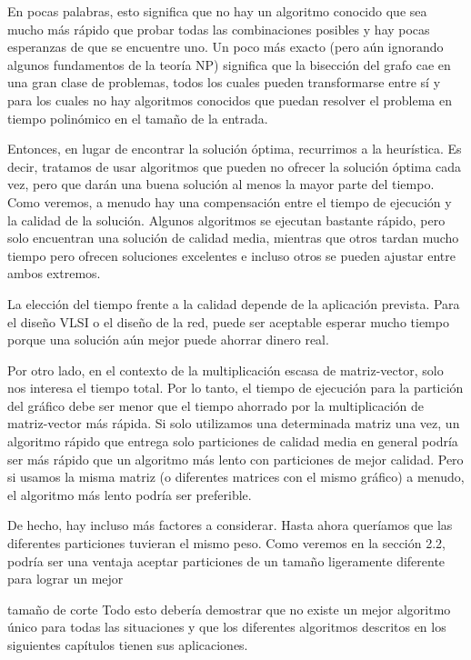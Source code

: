 En pocas palabras, esto significa que no hay un algoritmo conocido que sea mucho más rápido que probar todas las combinaciones posibles y hay pocas esperanzas de que se encuentre uno. Un poco más exacto (pero aún ignorando algunos fundamentos de la teoría NP) significa que la bisección del grafo cae en una gran clase de problemas, todos los cuales pueden transformarse entre sí y para los cuales no hay algoritmos conocidos que puedan resolver el problema en tiempo polinómico en el tamaño de la entrada.

Entonces, en lugar de encontrar la solución óptima, recurrimos a la heurística. Es decir, tratamos de usar algoritmos que pueden no ofrecer la solución óptima cada vez, pero que darán una buena solución al menos la mayor parte del tiempo. Como veremos, a menudo hay una compensación entre el tiempo de ejecución y la calidad de la solución. Algunos algoritmos se ejecutan bastante rápido, pero solo encuentran una solución de calidad media, mientras que otros tardan mucho tiempo pero ofrecen soluciones excelentes e incluso otros se pueden ajustar entre ambos extremos.

La elección del tiempo frente a la calidad depende de la aplicación prevista. Para el diseño VLSI o el diseño de la red, puede ser aceptable esperar mucho tiempo porque una solución aún mejor puede ahorrar dinero real.

Por otro lado, en el contexto de la multiplicación escasa de matriz-vector, solo nos interesa el tiempo total. Por lo tanto, el tiempo de ejecución para la partición del gráfico debe ser menor que el tiempo ahorrado por la multiplicación de matriz-vector más rápida.
Si solo utilizamos una determinada matriz una vez, un algoritmo rápido que entrega solo particiones de calidad media en general podría ser más rápido que un algoritmo más lento con particiones de mejor calidad. Pero si usamos la misma matriz (o diferentes matrices con el mismo gráfico) a menudo, el algoritmo más lento podría ser preferible.

De hecho, hay incluso más factores a considerar. Hasta ahora queríamos que las diferentes particiones tuvieran el mismo peso. Como veremos en la sección 2.2, podría ser una ventaja aceptar particiones de un tamaño ligeramente diferente para lograr un mejor

tamaño de corte
Todo esto debería demostrar que no existe un mejor algoritmo único para todas las situaciones y que los diferentes algoritmos descritos en los siguientes capítulos tienen sus aplicaciones.


